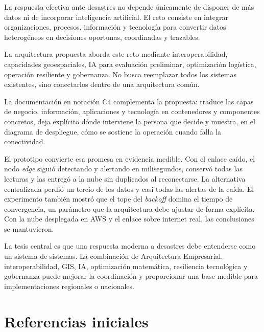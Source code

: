 \documentclass[11pt,a4paper]{article}
\begin{document}
La respuesta efectiva ante desastres no depende únicamente de disponer de más
datos ni de incorporar inteligencia artificial. El reto consiste en integrar
organizaciones, procesos, información y tecnología para convertir datos
heterogéneos en decisiones oportunas, coordinadas y trazables.

La arquitectura propuesta aborda este reto mediante interoperabilidad,
capacidades geoespaciales, IA para evaluación preliminar, optimización
logística, operación resiliente y gobernanza. No busca reemplazar todos los
sistemas existentes, sino conectarlos dentro de una arquitectura común.

La documentación en notación C4 complementa la propuesta: traduce las capas de
negocio, información, aplicaciones y tecnología en contenedores y componentes
concretos, deja explícito dónde interviene la persona que decide y muestra, en
el diagrama de despliegue, cómo se sostiene la operación cuando falla la
conectividad.

El prototipo convierte esa promesa en evidencia medible. Con el enlace caído,
el nodo \emph{edge} siguió detectando y alertando en milisegundos, conservó
todas las lecturas y las entregó a la nube sin duplicados al reconectarse. La
alternativa centralizada perdió un tercio de los datos y casi todas las
alertas de la caída. El experimento también mostró que el tope del
\emph{backoff} domina el tiempo de convergencia, un parámetro que la
arquitectura debe ajustar de forma explícita. Con la nube desplegada en AWS y
el enlace sobre internet real, las conclusiones se mantuvieron.

La tesis central es que una respuesta moderna a desastres debe entenderse como
un sistema de sistemas. La combinación de Arquitectura Empresarial,
interoperabilidad, GIS, IA, optimización matemática, resiliencia tecnológica y
gobernanza puede mejorar la coordinación y proporcionar una base medible para
implementaciones regionales o nacionales.

\section*{Referencias iniciales}
\end{document}

